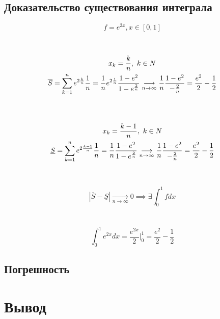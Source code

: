 \documentclass[12pt, a4paper]{article}
\begin{document}
\subsection{Доказательство существования интеграла}
\begin{equation}
    f=e^{2x}, x\in[0,1]
\end{equation}
\\
\\
\begin{equation}
    \begin{gathered}
        x_k= {k\over n}, k\in N \\
        \overline{S} = \sum\limits_{k=1}^{n} e^{2\frac{k}{n}} \frac{1}{n} = \frac{1}{n} {e^{2\frac{1}{n}} {{1 - e^2} \over {1 - e^{\frac{2}{n}}}}} \underset{n \to \infty}{\longrightarrow} \frac{1}{n} {{1 - e^2} \over -{\frac{2}{n}}} = \frac{e^2}{2} - \frac{1}{2}
    \end{gathered}
\end{equation}
\\
\\
\begin{equation}
    \begin{gathered}
        x_k= {{k - 1}\over n}, k\in N \\
        \underline{S} = \sum\limits_{k=1}^{n} e^{2\frac{k - 1}{n}} \frac{1}{n} = \frac{1}{n} {{1 - e^2} \over {1 - e^{\frac{2}{n}}}} \underset{n \to \infty}{\longrightarrow} \frac{1}{n} {{1 - e^2} \over -{\frac{2}{n}}} = \frac{e^2}{2} - \frac{1}{2}
    \end{gathered}
\end{equation}
\\
\\
\begin{equation}
    |\overline{S}-\underline{S}| \underset{n \to \infty}{\longrightarrow} 0 \implies \exists \int_{0}^{1} f dx
\end{equation}
\\
\\
\begin{equation}
    \int_0^1 e^{2x} dx = \frac{e^{2x}}{2}\bigg|_0^1 = \frac{e^2}{2} - \frac{1}{2}
\end{equation}
\newpage
\subsection{Погрешность}
\newpage
\section{Вывод}
\end{document}

